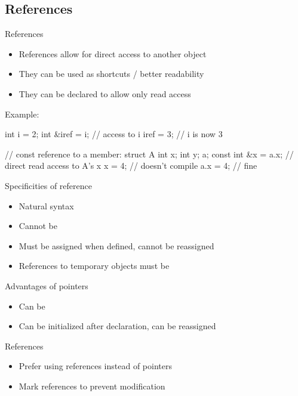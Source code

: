 \subsection[Refs]{References}

\begin{frame}[fragile]
  \begin{block}{References}
    \begin{itemize}
      \item References allow for direct access to another object
      \item They can be used as shortcuts / better readability
      \item They can be declared  to allow only read access
    \end{itemize}
  \end{block}

  \begin{exampleblock}{Example:}
    \begin{cppcode*}{}
      int i = 2;
      int &iref = i; // access to i
      iref = 3;      // i is now 3

      // const reference to a member:
      struct A { int x; int y; } a;
      const int &x = a.x; // direct read access to A's x
      x = 4;              // doesn't compile
      a.x = 4;            // fine
    \end{cppcode*}
  \end{exampleblock}
\end{frame}

\begin{frame}[fragile]
  \begin{block}{Specificities of reference}
    \begin{itemize}
    \item Natural syntax
    \item Cannot be 
    \item Must be assigned when defined, cannot be reassigned
    \item References to temporary objects must be 
    \end{itemize}
  \end{block}
  \begin{block}{Advantages of pointers}
    \begin{itemize}
    \item Can be 
    \item Can be initialized after declaration, can be reassigned
    \end{itemize}
  \end{block}
  \pause
  \begin{goodpractice}{References}
    \begin{itemize}
      \item Prefer using references instead of pointers
      \item Mark references  to prevent modification
    \end{itemize}
  \end{goodpractice}
\end{frame}
